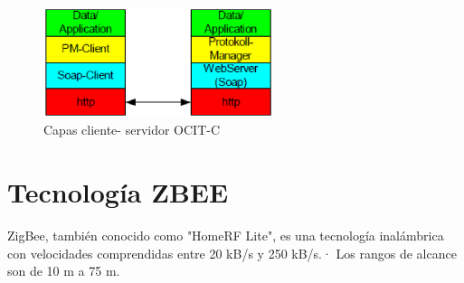 \begin{figure}[h]
    \centering
    \includegraphics[width=0.6\textwidth]{ima/ocit2_phplDTo60}
    \caption{Capas cliente- servidor OCIT-C \cite{17}}
    \label{fig:mesh14}
\end{figure}
\newpage
\section{Tecnología ZBEE}
ZigBee, también conocido como "HomeRF Lite", es una tecnología inalámbrica con velocidades comprendidas entre 20 kB/s y 250 kB/s.· Los rangos de alcance son de 10 m a 75 m\cite{12}.
